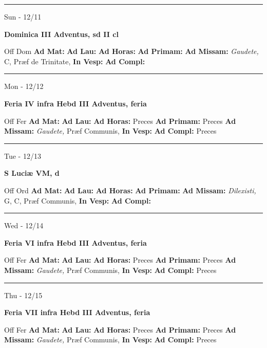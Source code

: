 \documentclass[letterpaper, 10pt]{article}
\begin{document}
\hrule
\begin{center}
Sun - 12/11
\end{center}\textbf{ \large Dominica III Adventus, \textnormal{\normalsize sd II cl}}
\begin{justify}
Off Dom
\textbf{Ad Mat: }
\textbf{Ad Lau: }
\textbf{Ad Horas: }
\textbf{Ad Primam: }
\textbf{Ad Missam:} \textit{Gaudete, } C, Præf de Trinitate, 
\textbf{In Vesp: }
\textbf{Ad Compl: }\end{justify}



\hrule
\begin{center}
Mon - 12/12
\end{center}\textbf{ \large Feria IV infra Hebd III Adventus, \textnormal{\normalsize feria}}
\begin{justify}
Off Fer
\textbf{Ad Mat: }
\textbf{Ad Lau: }
\textbf{Ad Horas: }Preces
\textbf{Ad Primam: }Preces
\textbf{Ad Missam:} \textit{Gaudete, } Præf Communis, 
\textbf{In Vesp: }
\textbf{Ad Compl: }Preces\end{justify}



\hrule
\begin{center}
Tue - 12/13
\end{center}\textbf{ \large S Luciæ VM, \textnormal{\normalsize d}}
\begin{justify}
Off Ord
\textbf{Ad Mat: }
\textbf{Ad Lau: }
\textbf{Ad Horas: }
\textbf{Ad Primam: }
\textbf{Ad Missam:} \textit{Dilexisti, } G, C, Præf Communis, 
\textbf{In Vesp: }
\textbf{Ad Compl: }\end{justify}



\hrule
\begin{center}
Wed - 12/14
\end{center}\textbf{ \large Feria VI infra Hebd III Adventus, \textnormal{\normalsize feria}}
\begin{justify}
Off Fer
\textbf{Ad Mat: }
\textbf{Ad Lau: }
\textbf{Ad Horas: }Preces
\textbf{Ad Primam: }Preces
\textbf{Ad Missam:} \textit{Gaudete, } Præf Communis, 
\textbf{In Vesp: }
\textbf{Ad Compl: }Preces\end{justify}



\hrule
\begin{center}
Thu - 12/15
\end{center}\textbf{ \large Feria VII infra Hebd III Adventus, \textnormal{\normalsize feria}}
\begin{justify}
Off Fer
\textbf{Ad Mat: }
\textbf{Ad Lau: }
\textbf{Ad Horas: }Preces
\textbf{Ad Primam: }Preces
\textbf{Ad Missam:} \textit{Gaudete, } Præf Communis, 
\textbf{In Vesp: }
\textbf{Ad Compl: }Preces\end{justify}
\end{document}
